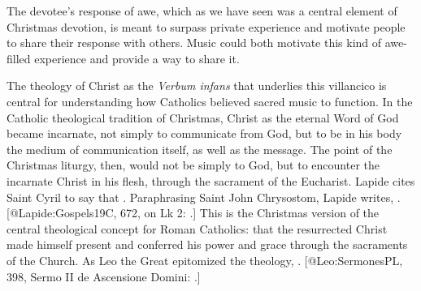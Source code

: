 \noindent
The devotee's response of awe, which as we have seen was a central element of
Christmas devotion, is meant to surpass private experience and motivate people
to share their response with others.
Music could both motivate this kind of awe-filled experience and provide a way
to share it.

The theology of Christ as the \emph{Verbum infans} that underlies this villancico is
central for understanding how Catholics believed sacred music to function.
In the Catholic theological tradition of Christmas, Christ as the eternal Word
of God became incarnate, not simply to communicate  from God, but to be
in his body the medium of communication itself, as well as the message.
The point of the Christmas liturgy, then, would not be simply to 
God, but to encounter the incarnate Christ in his flesh, through the sacrament
of the Eucharist.
Lapide cites Saint Cyril to say that .
Paraphrasing Saint John Chrysostom, Lapide writes, .
[@Lapide:Gospels19C, 672, on Lk 2:
.]
This is the Christmas version of the central theological concept for Roman
Catholics: that the resurrected Christ made himself present and conferred his
power and grace through the sacraments of the Church.
As Leo the Great epitomized the theology, .
[@Leo:SermonesPL, 398, Sermo II de Ascensione Domini:
.]

